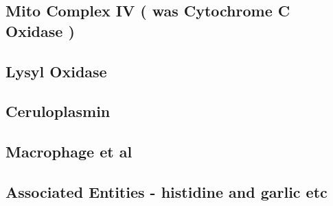 \mjmsitetab

\subsection{ Mito Complex IV ( was  Cytochrome C Oxidase )   }

\mjmcox

\subsection{ Lysyl Oxidase  }

\mjmlox

\subsection{ Ceruloplasmin   }

\mjmcp

\subsection{ Macrophage et al   }

\mjmmacro

\subsection{ Associated Entities - histidine and garlic etc   }

\mjmlig


